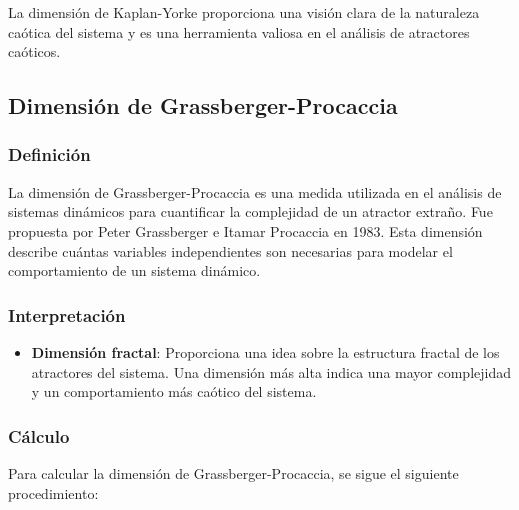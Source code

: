 \documentclass[11pt]{article}
\providecommand{\tightlist}{%
      \setlength{\itemsep}{0pt}\setlength{\parskip}{0pt}}
\begin{document}
La dimensión de Kaplan-Yorke proporciona una visión clara de la
naturaleza caótica del sistema y es una herramienta valiosa en el
análisis de atractores caóticos.

\hypertarget{dimensiuxf3n-de-grassberger-procaccia}{%
\subsection{Dimensión de
Grassberger-Procaccia}\label{dimensiuxf3n-de-grassberger-procaccia}}

\hypertarget{definiciuxf3n-2}{%
\subsubsection{Definición}\label{definiciuxf3n-2}}

La dimensión de Grassberger-Procaccia es una medida utilizada en el
análisis de sistemas dinámicos para cuantificar la complejidad de un
atractor extraño. Fue propuesta por Peter Grassberger e Itamar Procaccia
en 1983. Esta dimensión describe cuántas variables independientes son
necesarias para modelar el comportamiento de un sistema dinámico.

\hypertarget{interpretaciuxf3n-2}{%
\subsubsection{Interpretación}\label{interpretaciuxf3n-2}}

\begin{itemize}
\tightlist
\item
  \textbf{Dimensión fractal}: Proporciona una idea sobre la estructura
  fractal de los atractores del sistema. Una dimensión más alta indica
  una mayor complejidad y un comportamiento más caótico del sistema.
\end{itemize}

\hypertarget{cuxe1lculo-2}{%
\subsubsection{Cálculo}\label{cuxe1lculo-2}}

Para calcular la dimensión de Grassberger-Procaccia, se sigue el
siguiente procedimiento:
\end{document}
